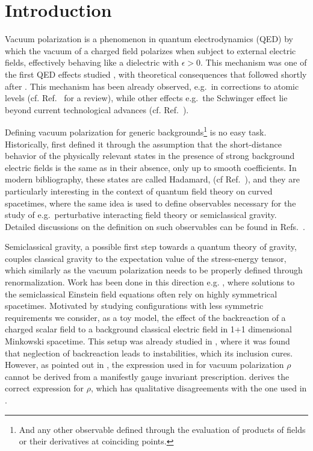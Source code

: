 \section{Introduction}



Vacuum polarization is a phenomenon in quantum electrodynamics (QED) by which the vacuum of a charged field polarizes when subject to external electric fields, effectively behaving like a dielectric with $\epsilon>0$. This mechanism was one of the first QED effects studied \cite{dirac_discussion_1934}, with theoretical consequences that followed shortly after \cite{uehling_polarization_1935,heisenberg_consequences_1936}. This mechanism has been already observed, e.g.~in corrections to atomic levels \cite{lamb_fine_1947} (cf. Ref.~\cite{mohr_qed_1998} for a review), while other effects e.g.~the Schwinger effect \cite{schwinger_gauge_1951} lie beyond current technological advances (cf. Ref.~\cite{fedotov_advances_2023}). 


Defining vacuum polarization  for generic backgrounds\footnote{And any other observable defined through the evaluation of products of fields or their derivatives at coinciding points.} is no easy task. Historically, \cite{dirac_discussion_1934} first defined it through the assumption that the short-distance behavior of the physically relevant states in the presence of strong background electric fields is the same as in their absence, only up to smooth coefficients. In modern bibliography, these states are called Hadamard, (cf Ref.~\cite{fewster_necessity_2013}), and they are particularly interesting in the context of quantum field theory on curved spacetimes, where the same idea is used to define observables necessary for the study of e.g.~perturbative interacting field theory or semiclassical gravity. Detailed discussions on the definition on such observables can be found in Refs.~\cite{hollands_local_2001,hollands_quantum_2015}.

Semiclassical gravity, a possible first step towards a quantum theory of gravity, couples classical gravity  to the expectation value of the stress-energy tensor, which similarly as the vacuum polarization needs to be properly defined through renormalization. Work has been done in this direction e.g. \cite{schanderBackreactionCosmology2021,gottschalk_cosmological_2023}, where solutions to the semiclassical Einstein field equations often rely on highly symmetrical spacetimes. Motivated by studying configurations with less symmetric requirements we consider, as a toy model, the effect of the backreaction of a charged scalar field to a background classical electric field in 1+1 dimensional Minkowski spacetime. This setup was already studied in  \cite{ambjorn_properties_1983}, where it was found that  neglection of backreaction leads to instabilities, which  its inclusion cures. 
However, as pointed out in \cite{schlemmer_current_2015}, the expression used in \cite{ambjorn_properties_1983} for vacuum polarization $\rho$  cannot be derived from a manifestly gauge invariant prescription. \cite{wernersson_vacuum_2021} derives the correct expression for $\rho$, which has  qualitative disagreements with the one used in \cite{ambjorn_properties_1983}. 

